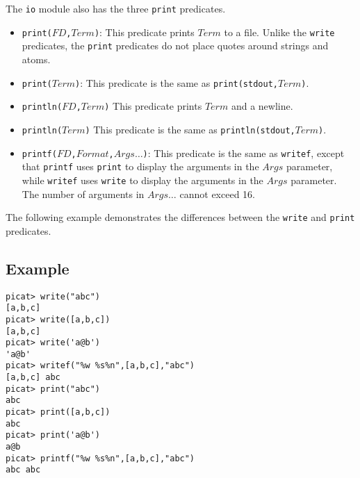 The \texttt{io} module also has the three \texttt{print} predicates.  
\begin{itemize}
\item \texttt{print($FD$,$Term$)}: This predicate prints $Term$ to a file.  Unlike the \texttt{write} predicates, the \texttt{print} predicates do not place quotes around strings and atoms. 
\item \texttt{print($Term$)}: This predicate is the same as \texttt{print(stdout,$Term$)}.
\item \texttt{println($FD$,$Term$)} This predicate prints $Term$ and a newline.
\item \texttt{println($Term$)} This predicate is the same as \texttt{println(stdout,$Term$)}.
\item \texttt{printf($FD$,$Format$,$Args\ldots$)}: This predicate is the same as \texttt{writef}, except that \texttt{printf} uses \texttt{print} to display the arguments in the $Args$ parameter, while \texttt{writef} uses \texttt{write} to display the arguments in the $Args$ parameter. The number of arguments in $Args\ldots$ cannot exceed 16.
\end{itemize}

The following example demonstrates the differences between the \texttt{write} and \texttt{print} predicates.  
\subsection*{Example}
\begin{verbatim}
picat> write("abc")
[a,b,c]
picat> write([a,b,c])
[a,b,c]
picat> write('a@b')
'a@b'
picat> writef("%w %s%n",[a,b,c],"abc")
[a,b,c] abc
picat> print("abc")
abc
picat> print([a,b,c])
abc
picat> print('a@b')
a@b
picat> printf("%w %s%n",[a,b,c],"abc")
abc abc
\end{verbatim}

